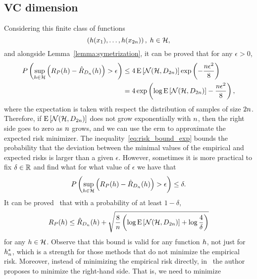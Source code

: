 \subsection{VC dimension}
%
Considering this finite class of functions
$$ \left(h(x_1), \ldots, h(x_{2 n})  \right), \; h \in \mathcal{H} ,$$
and alongside Lemma~\ref{lemma:symetrization}, it can be proved that for any $\epsilon > 0$,
\begin{equation}
    \label{eq:risk_bound_exp}
    \begin{aligned}
        P \left(\sup_{\hypf \in \hypspace} \left(\exprisk(\hypf) - \empriskn(\hypf) \right) > \epsilon \right) &\leq 4 \expect\left[\mathcal{N}(\hypspace, \sample_{2 \nsamples}) \right] \exp\left(- \frac{\nsamples \epsilon^2}{8} \right) \\
        &= 4 \exp\left(\log \expect\left[\mathcal{N}(\hypspace, \sample_{2 \nsamples}) \right] - \frac{\nsamples \epsilon^2}{8} \right) ,
    \end{aligned}
\end{equation}
where the expectation is taken with respect the distribution of samples of size $2n$.
Therefore, if $\operatorname{E}\left[\mathcal{N}(\mathcal{H}, D_{2 n}) \right]$ does not grow exponentially with $n$, then the right side goes to zero as $n$ grows, and we can use the \acrshort{erm} to approximate the expected risk minimizer. 
%
%
The inequality~\eqref{eq:risk_bound_exp} bounds the probability that the deviation between the minimal values of the empirical and expected risks is larger than a given $\epsilon$. However, sometimes it is more practical to fix $\delta \in \mathbb{R}$ and find what for what value of $\epsilon$ we have that 
$$ P \left(\sup_{h \in \mathcal{H}} \left(R_P(h) - \hat{R}_{D_{n}}(h) \right) > \epsilon \right) \leq \delta .$$
It can be proved~\citep{vapnik1982estimation} that with a probability of at least $1 - \delta$, 
\begin{equation}
    \label{eq:risk_bound_ent}
    \exprisk(\hypf) \leq \empriskn(\hypf) + \sqrt{\frac{8}{\nsamples} \left(\log \expect\left[\mathcal{N}(\hypspace, \sample_{2 \nsamples})\right] + \log \frac{4}{\delta} \right)}
\end{equation}
for any $h \in \mathcal{H}$. Observe that this bound is valid for any function $h$, not just for ${h}^*_n$, which is a strength for those methods that do not minimize the empirical risk.
%
Moreover, instead of minimizing the empirical risk directly, in~\citet{Vapnik00} the author proposes to minimize the right-hand side. That is, we need to minimize 
